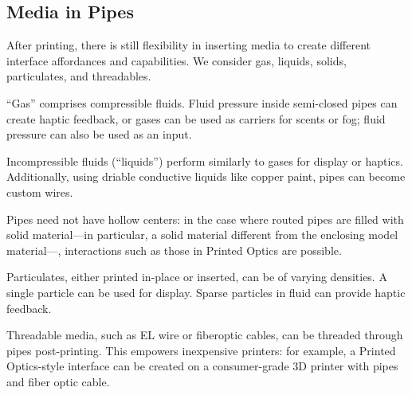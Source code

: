 \subsection{Media in Pipes}
After printing, there is still flexibility in inserting media to create different interface affordances and capabilities. We consider gas, liquids, solids, particulates, and threadables.

``Gas'' comprises compressible fluids.  Fluid pressure inside semi-closed pipes can create haptic feedback, or gases can be used as carriers for scents or fog; fluid pressure can also be used as an input.

Incompressible fluids (``liquids'') perform similarly to gases for display or haptics.  Additionally, using driable conductive liquids like copper paint, pipes can become custom wires.

Pipes need not have hollow centers: in the case where routed pipes are filled with solid material---in particular, a solid material different from the enclosing model material---, interactions such as those in Printed Optics \cite{Willis-printedoptics} are possible.

Particulates, either printed in-place or inserted, can be of varying densities.  A single particle can be used for display.  Sparse particles in fluid can provide haptic feedback.

Threadable media, such as EL wire or fiberoptic cables, can be threaded through pipes post-printing.  This empowers inexpensive printers: for example, a Printed Optics-style interface can be created on a consumer-grade 3D printer with pipes and fiber optic cable.
